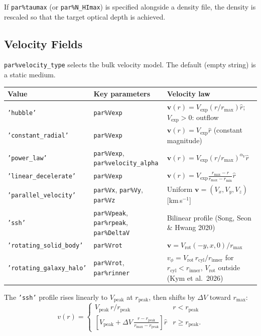 \documentclass[english,a4paper]{my_memo}
\newcommand{\parm}[1]{\texttt{par\%#1}}
\begin{document}
If \parm{taumax} (or \parm{N\_HImax}) is specified alongside a density file, the density
is rescaled so that the target optical depth is achieved.

\subsection{Velocity Fields}
\label{sec:velocity}

\parm{velocity\_type} selects the bulk velocity model.  The default (empty string) is a
static medium.

\begin{center}
\begin{tabular}{L{4.7cm}L{3.0cm}L{5.8cm}}
\toprule
Value & Key parameters & Velocity law \\
\midrule
\texttt{'hubble'} & \parm{Vexp} & $\boldsymbol{v}(r) = V_\text{exp}(r/r_\text{max})\hat{r}$; $V_\text{exp}>0$: outflow \\
\texttt{'constant\_radial'} & \parm{Vexp} & $\boldsymbol{v}(r) = V_\text{exp}\hat{r}$ (constant magnitude) \\
\texttt{'power\_law'} & \parm{Vexp}, \parm{velocity\_alpha} & $\boldsymbol{v}(r) = V_\text{exp}(r/r_\text{max})^{\alpha_V}\hat{r}$ \\
\texttt{'linear\_decelerate'} & \parm{Vexp} & $\boldsymbol{v}(r) = V_\text{exp}\frac{r_\text{max}-r}{r_\text{max}-r_\text{min}}\hat{r}$ \\
\texttt{'parallel\_velocity'} & \parm{Vx}, \parm{Vy}, \parm{Vz} & Uniform $\boldsymbol{v} = (V_x,V_y,V_z)$ [km\,s$^{-1}$] \\
\texttt{'ssh'} & \parm{Vpeak}, \parm{rpeak}, \parm{DeltaV} & Bilinear profile (Song, Seon \& Hwang 2020) \\
\texttt{'rotating\_solid\_body'} & \parm{Vrot} & $\boldsymbol{v} = V_\text{rot}(-y,x,0)/r_\text{max}$ \\
\texttt{'rotating\_galaxy\_halo'} & \parm{Vrot}, \parm{rinner} & $v_\phi = V_\text{rot}\,r_\text{cyl}/r_\text{inner}$ for $r_\text{cyl}<r_\text{inner}$, $V_\text{rot}$ outside (Kym et al.\ 2026) \\
\bottomrule
\end{tabular}
\end{center}

The \texttt{'ssh'} profile rises linearly to $V_\text{peak}$ at $r_\text{peak}$, then
shifts by $\Delta V$ toward $r_\text{max}$:
\begin{equation}
  v(r) = \begin{cases}
    V_\text{peak}\,r/r_\text{peak} & r < r_\text{peak} \\
    \left[V_\text{peak} + \Delta V\,\frac{r - r_\text{peak}}{r_\text{max} - r_\text{peak}}\right]\hat{r} & r \geq r_\text{peak}.
  \end{cases}
\end{equation}
\end{document}
